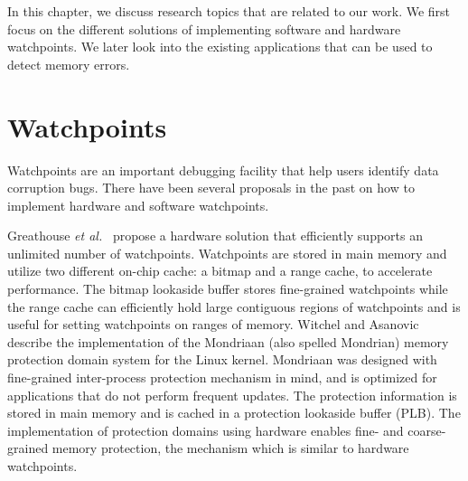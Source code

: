 In this chapter, we discuss research topics that are related to our work. We first focus on the different solutions of implementing software and hardware watchpoints. We later look into the existing applications that can be used to detect memory errors.


\section{Watchpoints}
Watchpoints are an important debugging facility that help users identify data corruption bugs. There have been several proposals in the past on how to implement hardware and software watchpoints.



Greathouse \emph{et al.}~\cite{UnlimitedWatchpoints} propose a hardware solution that efficiently supports an unlimited number of watchpoints. Watchpoints are stored in main memory and utilize two different on-chip cache: a bitmap and a range cache, to accelerate performance. The bitmap lookaside buffer stores fine-grained watchpoints while the range cache can efficiently hold large contiguous regions of watchpoints and is useful for setting watchpoints on ranges of memory. 
Witchel and Asanovic~\cite{Mondrix} describe the implementation of the Mondriaan (also spelled Mondrian) memory protection domain system for the Linux kernel. Mondriaan was designed with fine-grained inter-process protection mechanism in mind, and is optimized for applications that do not perform frequent updates. The protection information is stored in main memory and is cached in a protection lookaside buffer (PLB). The implementation of protection domains using hardware enables fine- and coarse-grained memory protection, the mechanism which is similar to hardware watchpoints.

